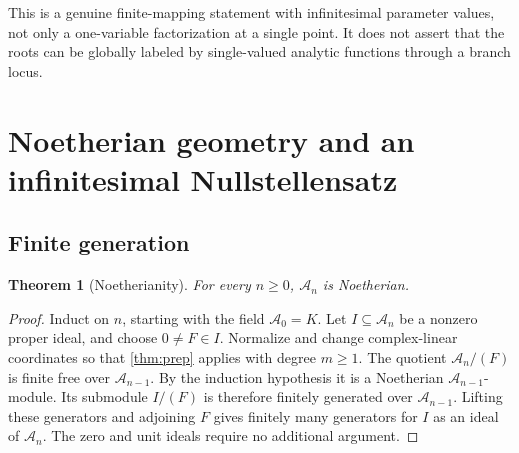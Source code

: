 \documentclass[11pt,letterpaper]{article}
\newtheorem{theorem}{Theorem}[section]
\theoremstyle{definition}
\theoremstyle{remark}
\newcommand{\A}{\mathscr A}
\numberwithin{equation}{section}
\begin{document}
This is a genuine finite-mapping statement with infinitesimal parameter values, not only a one-variable factorization at a single point. It does not assert that the roots can be globally labeled by single-valued analytic functions through a branch locus.

\section{Noetherian geometry and an infinitesimal Nullstellensatz}\label{sec:structure}

\subsection{Finite generation}
\begin{theorem}[Noetherianity]\label{thm:noetherian}
For every $n\ge0$, $\A_n$ is Noetherian.
\end{theorem}
\begin{proof}
Induct on $n$, starting with the field $\A_0=K$. Let $I\subseteq\A_n$ be a nonzero proper ideal, and choose $0\ne F\in I$. Normalize and change complex-linear coordinates so that \cref{thm:prep} applies with degree $m\ge1$. The quotient $\A_n/(F)$ is finite free over $\A_{n-1}$. By the induction hypothesis it is a Noetherian $\A_{n-1}$-module. Its submodule $I/(F)$ is therefore finitely generated over $\A_{n-1}$. Lifting these generators and adjoining $F$ gives finitely many generators for $I$ as an ideal of $\A_n$. The zero and unit ideals require no additional argument.
\end{proof}
\end{document}
